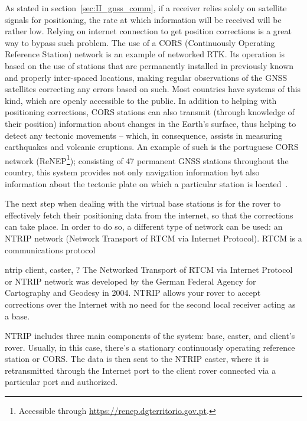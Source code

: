 As stated in section~\ref{sec:II_gnss_comm}, if a receiver relies solely on satellite signals for positioning, the rate at which information will be received will be rather low. Relying on internet connection to get position corrections is a great way to bypass such problem. The use of a CORS (Continuously Operating Reference Station) network is an example of networked RTK. Its operation is based on the use of stations that are permanently installed in previously known and properly inter-spaced locations, making regular observations of the GNSS satellites correcting any errors based on such.
Most countries have systems of this kind, which are openly accessible to the public. In addition to helping with positioning corrections, CORS stations can also transmit (through knowledge of their position) information about changes in the Earth's surface, thus helping to detect any tectonic movements -- which, in consequence, assists in measuring earthquakes and volcanic eruptions. An example of such is the portuguese CORS network (ReNEP\footnote{Accessible through \url{https://renep.dgterritorio.gov.pt}.}); consisting of 47 permanent GNSS stations throughout the country, this system provides not only navigation information byt also information about the tectonic plate on which a particular station is located~\cite{ReNEP_ppt_2018}.

The next step when dealing with the virtual base stations is for the rover to effectively fetch their positioning data from the internet, so that the corrections can take place. In order to do so, a different type of network can be used: an NTRIP network (Network Transport of RTCM via Internet Protocol). RTCM is a communications protocol ~\cite{rtcm_2003}

ntrip client, caster, ?
The Networked Transport of RTCM via Internet Protocol or NTRIP network was developed by the German Federal Agency for Cartography and Geodesy in 2004. NTRIP allows your rover to accept corrections over the Internet with no need for the second local receiver acting as a base.

NTRIP includes three main components of the system: base, caster, and client's rover. Usually, in this case, there's a stationary continuously operating reference station or CORS. The data is then sent to the NTRIP caster, where it is retransmitted through the Internet port to the client rover connected via a particular port and authorized. 


